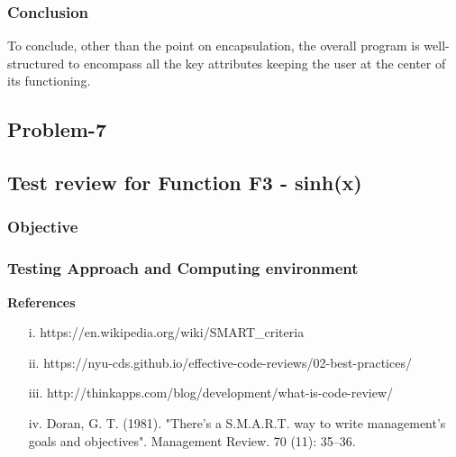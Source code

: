 \documentclass[12pt]{report}
\begin{document}
	\subsubsection{Conclusion}To conclude, other than the point on encapsulation, the overall program is well-structured to encompass all the key attributes keeping the user at the center of its functioning.
\begin{center}
	\section{Problem-7}
\end{center}

\subsection{Test review for Function F3 - sinh(x)}
\subsubsection{Objective}
\subsubsection{Testing Approach and Computing environment}


\pagebreak\textbf{References}
	\begin{enumerate}
	\item[i.]https://en.wikipedia.org/wiki/SMART\_criteria
	\item[ii.]https://nyu-cds.github.io/effective-code-reviews/02-best-practices/
	\item[iii.]http://thinkapps.com/blog/development/what-is-code-review/
	\item[iv.] Doran, G. T. (1981). "There's a S.M.A.R.T. way to write management's goals and objectives". Management Review. 70 (11): 35–36.
	\end{enumerate}
\end{document}
